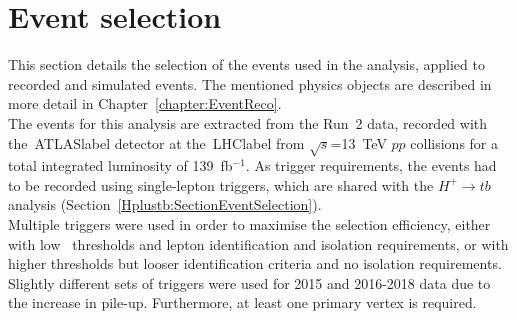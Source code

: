 \section{Event selection}
\label{tqX:SectionEventSelection}
This section details the selection of the events used in the analysis, applied to recorded and simulated events. The mentioned physics objects are described in more detail in Chapter~\ref{chapter:EventReco}.\\

The events for this analysis are extracted from the Run~2 data, recorded with the~\acrshort{ATLASlabel} detector at the~\acrshort{LHClabel} from $\sqrt{s}$=13~TeV $pp$ collisions for a total integrated luminosity of 139~fb$^{-1}$. As trigger requirements, the events had to be recorded using single-lepton triggers, which are shared with the $H^+\to tb$ analysis (Section~\ref{Hplustb:SectionEventSelection}).\\

Multiple triggers were used in order to maximise the selection efficiency, either with low \pT\ thresholds and lepton identification and isolation requirements, or with higher thresholds but looser identification criteria and no isolation requirements. Slightly different sets of triggers were used for 2015 and 2016-2018 data due to the increase in pile-up. Furthermore, at least one primary vertex is required.\\ %


